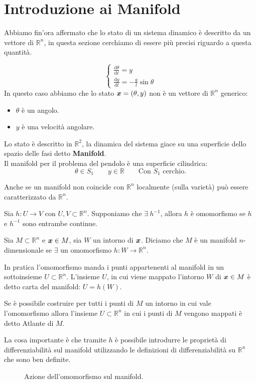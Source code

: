 \section{Introduzione ai Manifold}%
\label{sub:Introduzione ai Manifold}
Abbiamo fin'ora affermato che lo stato di un sistema dinamico è descritto da un vettore di $\mathbb{R}^n$, in questa sezione cerchiamo di essere più precisi riguardo a questa quantità.
\begin{exmp}
    \[
        \begin{cases}
            \frac{\text{d} \theta}{\text{d} t} = y\\
	    \frac{\text{d} y}{\text{d} t} = -\frac{g}{l}\sin\theta
        \end{cases}
    \] 
    In questo caso abbiamo che lo stato $\boldsymbol{x} = (\theta, y)$ non è un vettore di $\mathbb{R}^n$ generico: 
    \begin{itemize}
        \item $\theta$ è un angolo. 
	\item $y$ è una velocità angolare.
    \end{itemize}
    Lo stato è descritto in $\mathbb{R}^2$, la dinamica del sistema giace su una superficie dello spazio delle fasi detto \textbf{Manifold}.\\
    Il manifold per il problema del pendolo è una superficie cilindrica:
    \[
        \theta\in S_1 \qquad y \in \mathbb{R}\qquad \text{Con $S_1$ cerchio}
    .\] 
\end{exmp}
\noindent
Anche se un manifold non coincide con $\mathbb{R}^n$ localmente (sulla varietà) può essere caratterizzato da $\mathbb{R}^n$.
\begin{defn}[Omomorfismo]
    Sia $h: U\to V$ con $U, V \subset \mathbb{R}^n$. Supponiamo che $\exists \ h^{-1}$, allora $h$ è omomorfismo se $h$ e $h^{-1}$ sono entrambe continue.
\end{defn}
\noindent
\begin{defn}
    Sia $M\subset \mathbb{R}^n$ e $\boldsymbol{x}  \in M$, sia $W$ un intorno di $\boldsymbol{x}$. Diciamo che $M$ è un manifold $n$-dimensionale se $\exists$ un omomorfismo $h: W\to \mathbb{R}^n$.
\end{defn}
\noindent
In pratica l'omomorfismo manda i punti appartenenti al manifold in un sottoinsieme $U \subset \mathbb{R}^n$. L'insieme $U$, in cui viene mappato l'intorno $W$ di $\boldsymbol{x}\in M$ è detto carta del manifold: $U = h(W)$.\\
\begin{defn}
Se è possibile costruire per tutti i punti di $M$ un intorno in cui vale l'omomorfismo allora l'insieme $U \subset \mathbb{R}^n$ in cui i punti di $M$ vengono mappati è detto Atlante di $M$.
\end{defn}
\noindent
La cosa importante è che tramite $h$ è possibile introdurre le proprietà di differenziabilità sul manifold utilizzando le definizioni di differenziabilità su $\mathbb{R}^n$ che sono ben definite.
\begin{figure}[H]
    \centering
    \caption{\scriptsize Azione dell'omomorfismo sul manifold.}
    \label{fig:3_2}
\end{figure}

